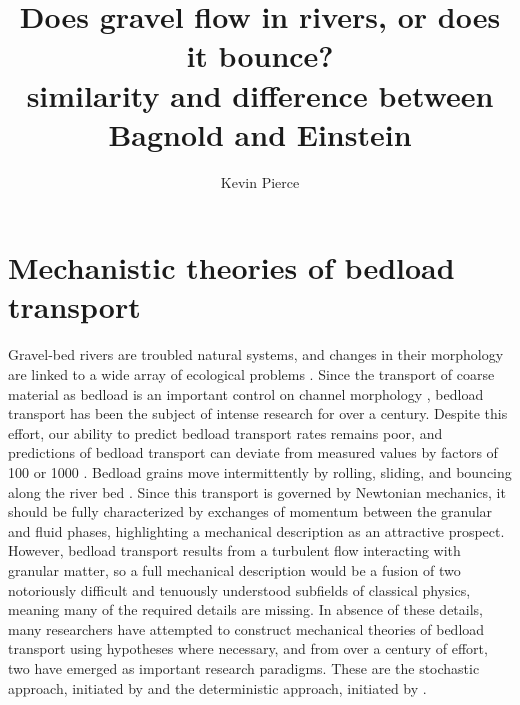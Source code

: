 \documentclass{article}
\begin{document}
\title{Does gravel flow in rivers, or does it bounce?\\ similarity and difference between Bagnold and Einstein}
\author{Kevin Pierce}
\maketitle

\begin{abstract}
\end{abstract}
\section{Mechanistic theories of bedload transport}

Gravel-bed rivers are troubled natural systems, and changes in their morphology are linked to a wide array of ecological problems \citep{Gaeuman2016}.
Since the transport of coarse material as bedload is an important control on channel morphology \citep{Church2006, Recking2016}, bedload transport has been the subject of intense research for over a century. 
Despite this effort, our ability to predict bedload transport rates remains poor, and predictions of bedload transport can deviate from measured values by factors of 100 or 1000 \citep{Gomez1989, Barry2004, Recking2012}. 
Bedload grains move intermittently by rolling, sliding, and bouncing along the river bed \citep{Einstein1950, Bagnold1973}. 
Since this transport is governed by Newtonian mechanics, it should be fully characterized by exchanges of momentum between the granular and fluid phases, highlighting a mechanical description as an attractive prospect.
However, bedload transport results from a turbulent flow interacting with granular matter, so a full mechanical description would be a fusion of two notoriously difficult and tenuously understood subfields of classical physics, meaning many of the required details are missing.
In absence of these details, many researchers have attempted to construct mechanical theories of bedload transport using hypotheses where necessary, and from over a century of effort, two have emerged as important research paradigms. 
These are the stochastic approach, initiated by \citet{Einstein1937, Einstein1950, Einstein1964} and the deterministic approach, initiated by \citet{Bagnold1956, Bagnold1966, Bagnold1973}. 
\end{document}
